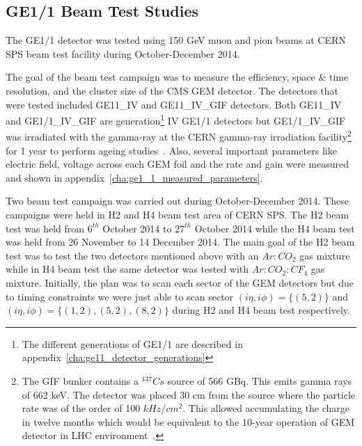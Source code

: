 
\subsection{GE1/1 Beam Test Studies}
The GE1/1 detector was tested using 150 GeV muon and pion beams at CERN SPS beam test facility during October-December 2014. 

The goal of the beam test campaign was to measure the efficiency, space \& time resolution, and the cluster size of the CMS GEM detector. 
The detectors that were tested included GE11\_IV and GE11\_IV\_GIF detectors.
Both GE11\_IV and GE1/1\_IV\_GIF are generation\footnote{The different generations of GE1/1 are described in appendix~\ref{cha:ge11_detector_generations}} IV GE1/1 detectors but GE1/1\_IV\_GIF was irradiated with the gamma-ray at the CERN gamma-ray irradiation facility\footnote{The GIF bunker contains a $^{137}Cs$ source of 566 GBq. This emits gamma rays of 662 keV. The detector was placed 30 cm from the source where the particle rate was of the order of 100 $kHz/cm^2$. This allowed accumulating the charge in twelve months which would be equivalent to the 10-year operation of GEM detector in LHC environment~\cite{Merlin2013}.} for 1 year to perform ageing studies~\cite{Merlin2013}. Also, several important parameters like electric field, voltage across each GEM foil and the rate and gain were measured and shown in appendix~\ref{cha:ge1_1_measured_parameters}.

Two beam test campaign was carried out during October-December 2014.
These campaigns were held in H2 and H4 beam test area of CERN SPS.
The H2 beam test was held from $6^{th}$ October 2014 to $27^{th}$ October 2014 while the H4 beam test was held from 26 November to 14 December 2014.
The main goal of the H2 beam test was to test the two detectors mentioned above with an $Ar:CO_2$ gas mixture while in H4 beam test the same detector was tested with $Ar:CO_2:CF_4$ gas mixture.
Initially, the plan was to scan each sector of the GEM detectors but due to timing constraints we were just able to scan sector $(i\eta, i\phi)=\{(5,2)\}$ and $(i\eta,i\phi)=\{(1,2),(5,2),(8,2)\}$ during H2 and H4 beam test respectively.  

